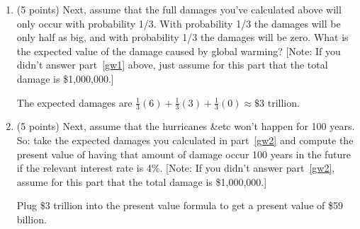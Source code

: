 \documentclass{article}
\begin{document}
\begin{enumerate}
\begin{enumerate}
    \item \begin{EXAM} (5 points) Next, assume that the full damages you've calculated above will only occur with probability 1/3. With probability 1/3 the damages will be only half as big, and with probability 1/3 the damages will be zero. What is the expected value of the damage caused by global warming? [Note: If you didn't answer part~\ref{gw1} above, just assume for this part that the total damage is \$1,000,000.] \label{gw2} \vspace{1.5in} \end{EXAM}

\begin{KEY}
The expected damages are $\frac{1}{3}(6) + \frac{1}{3}(3) +
\frac{1}{3}(0) \approx \$3$ trillion.
\end{KEY}



    \item \begin{EXAM} (5 points) Next, assume that the hurricanes \&etc won't happen for 100 years. So: take the expected damages you calculated in part~\ref{gw2} and compute the present value of having that amount of damage occur 100 years in the future if the relevant interest rate is 4\%. [Note: If you didn't answer part~\ref{gw2}, assume for this part that the total damage is \$1,000,000.] \vspace{1.5in} \end{EXAM}

\begin{KEY}
Plug \$3 trillion into the present value formula to get a present
value of \$59 billion.
\end{KEY}


    \end{enumerate}



\end{enumerate}


\theendnotes
\end{document}

